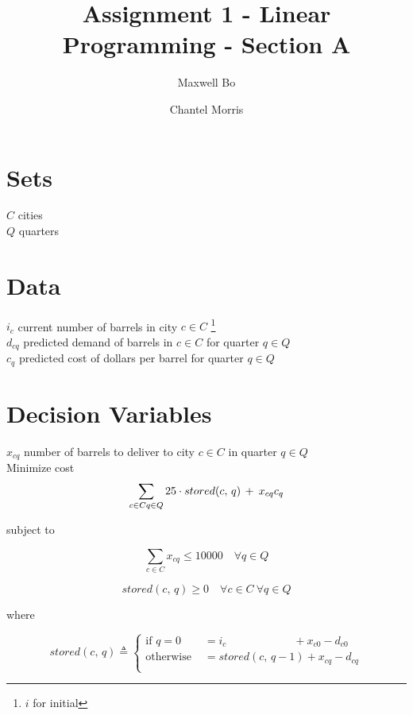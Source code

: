 \documentclass[a4paper]{article}
\title{Assignment 1 - Linear Programming - Section A}
\author{Maxwell Bo  \and Chantel Morris}
\begin{document}
 

\maketitle

\section*{Sets}

$C$ cities\\
$Q$ quarters\\

\section*{Data}

$i_c$ current number of barrels in city $c \in C$ \footnote{$i$ for initial}\\
$d_{cq}$ predicted demand of barrels in $c \in C$ for quarter $q \in Q$\\
$c_q$ predicted cost of dollars per barrel for quarter $q \in Q$\\

\section*{Decision Variables}

$x_{cq}$ number of barrels to deliver to city $c \in C$ in quarter $q \in Q$\\

Minimize cost
\[
\sum_{c \in C\\ q \in Q} 25 \cdot stored(c,\, q)\, +\: x_{cq} c_q
\]

subject to

\[
\sum_{c \in C} x_{cq} \leq 10000 \quad \forall q \in Q
\]


\[
stored(c,\, q) \geq 0 \quad \forall c \in C\ \forall q \in Q 
\]

where

\[
stored(c,\, q) \triangleq \begin{cases}
    \text{if }  q = 0 & = i_{c} \quad \qquad \qquad \quad +  x_{c0} - d_{c0}\\
    \text{otherwise } & = stored(c,\, q - 1) + x_{cq} - d_{cq}\\
\end{cases}
\]
\end{document}
